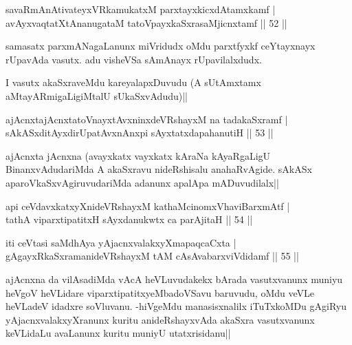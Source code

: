 
\begin{shl}
savaRmAnAtivateyxVRkamukatxM parxtayxkicxdAtamxkamf |\\
avAyxvaqtatXtAnanugataM tatoV\s payxkaSxrasaMjicnxtamf \hfill || 52 ||
\end{shl}

\begin{artha}
samasatx parxmANagaLanunx miVridudx oMdu parxtfyxkf ceYtayxnayx rUpavAda vasutx. adu visheVSa sAmAnayx rUpavilalxdudx.

I vasutx akaSxraveMdu kareyalapxDuvudu (A sUtAmxtamx aMtayARmigaLigiMtalU sUkaSxvAdudu)||
\end{artha}


\begin{shl}
ajAcnxtajAcnxtatoV\s nayxtAvxninxdeVRshayxM na tadakaSxramf |\\
sAkASxditAyxdirUpatAvxnAnxpi sAyxtatxdapahanutiH \hfill || 53 ||
\end{shl}

\begin{artha}
ajAcnxta jAcnxna (avayxkatx vayxkatx kAraNa kAyaRgaLigU BinanxvAdudariMda A akaSxravu nideRshisalu anahaRvAgide. sAkASx aparoVkaSxvAgiruvudariMda adanunx apalApa mADuvudilalx||
\end{artha}%

\begin{shl}
api ceVdavxkatxyXnideVRshayxM kathaMcinomxVhaviBarxmAtf |\\
tathA viparxtipatitxH sAyxdanukwtx ca parAjitaH \hfill || 54 ||
\end{shl}

\begin{shl}
iti ceVtasi saMdhAya yAjacnxvalakxyXmapaqcaCxta |\\
gAgayxRkaSxramanideVRshayxM tAM cAsAvabarxviVdidamf \hfill || 55 ||
\end{shl}

\begin{artha}
ajAcnxna da vilAsadiMda vAcA heVLuvudakekx bArada vasutxvanunx muniyu heVgoV heVLidare viparxtipatitxyeMbadoVSavu baruvudu, oMdu veVLe heVLadeV idadxre soVluvanu. -hiVgeMdu manasisxnalilx iTuTxkoMDu gAgiRyu yAjacnxvalakxyXranunx kuritu anideRshayxvAda akaSxra vasutxvanunx keVLidaLu avaLanunx kuritu muniyU utatxrisidanu||
\end{artha}


